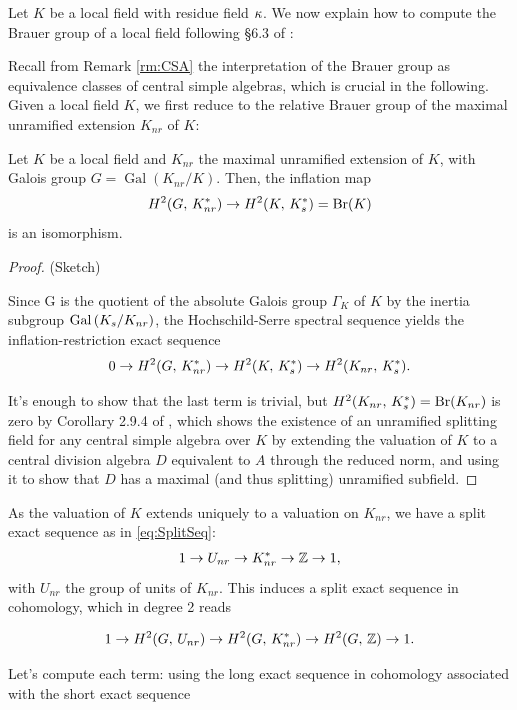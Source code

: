 \documentclass[a4paper, oneside]{memoir}
\begin{document}
Let $K$ be a local field with residue field $\kappa$. We now explain how to compute the Brauer group of a local field following \S 6.3 of \cite{SzamuelyGille}:

Recall from Remark \ref{rm:CSA} the interpretation of the Brauer group as equivalence classes of central simple algebras, which is crucial in the following. Given a local field $K$, we first reduce to the relative Brauer group of the maximal unramified extension $K_{nr}$ of $K$:

\begin{proposition}
    Let $K$ be a local field and $K_{nr}$ the maximal unramified extension of $K$, with Galois group $G=\operatorname{Gal}{(K_{nr}/K)}$. Then, the inflation map
    \[
        H^{2}( G, \, K_{nr}^* )\to H^{2}( K, \, K_{s}^* )= \mathrm{Br}(K)
    \]
    is an isomorphism.

\end{proposition}

\begin{proof}{(Sketch)}

    Since G is the quotient of the absolute Galois group $\Gamma_K$ of $K$ by the inertia subgroup $\operatorname{Gal}{(K_{s}/K_{nr})}$, the Hochschild-Serre spectral sequence yields the inflation-restriction exact sequence
    \[
        0\to H^{2}( G, \, K_{nr}^* )\to H^{2}( K, \, K_{s}^* )\to H^{2}( K_{nr}, \, K_{s}^* ).
    \]

    It's enough to show that the last term is trivial, but $H^{2}( K_{nr}, \, K_{s}^* )=\mathrm{Br}(K_{nr})$ is zero by Corollary 2.9.4 of \cite{SzamuelyGille}, which shows the existence of an unramified splitting field for any central simple algebra over $K$ by extending the valuation of $K$ to a central division algebra $D$ equivalent to $A$ through the reduced norm, and using it to show that $D$ has a maximal (and thus splitting) unramified subfield.
\end{proof}

As the valuation of $K$ extends uniquely to a valuation on $K_{nr}$, we have a split exact sequence as in \eqref{eq:SplitSeq}:
\[
    1\to U_{nr} \to K_{nr}^*\to\mathbb{Z}\to 1,
\]
with $U_{nr}$ the group of units of $K_{nr}$. This induces a split exact sequence in cohomology, which in degree 2 reads

\begin{equation}\label{eq:BrSeq}
    1\to H^{2}( G, \, U_{nr} )\to H^{2}( G, \, K_{nr}^* )\to H^{2}( G, \, \mathbb{Z} )\to 1.
\end{equation}

Let's compute each term: using the long exact sequence in cohomology associated with the short exact sequence
\end{document}
